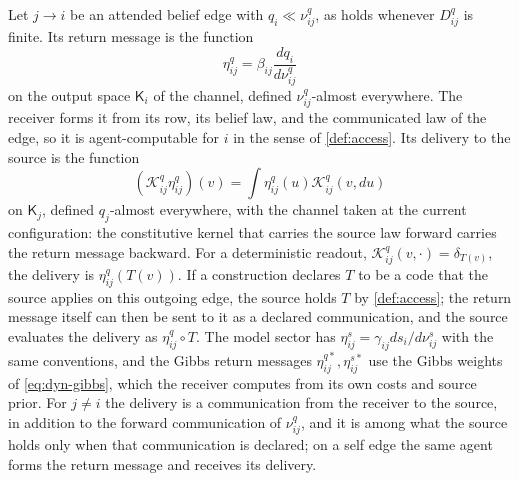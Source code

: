 Let $j\to i$ be an attended belief edge with $q_i\ll\nu^q_{ij}$, as holds whenever $D^q_{ij}$ is finite. Its return message is the function
\begin{equation}
 \eta^q_{ij}=\beta_{ij}\frac{dq_i}{d\nu^q_{ij}}
 \label{eq:dyn-return-message}
\end{equation}
on the output space $\mathsf K_i$ of the channel, defined $\nu^q_{ij}$-almost everywhere. The receiver forms it from its row, its belief law, and the communicated law of the edge, so it is agent-computable for $i$ in the sense of \cref{def:access}. Its delivery to the source is the function
\begin{equation}
 (\mathcal K^q_{ij}\eta^q_{ij})(v)=\int\eta^q_{ij}(u)\mathcal K^q_{ij}(v,du)
 \label{eq:dyn-return-delivery}
\end{equation}
on $\mathsf K_j$, defined $q_j$-almost everywhere, with the channel taken at the current configuration: the constitutive kernel that carries the source law forward carries the return message backward. For a deterministic readout, $\mathcal K^q_{ij}(v,\cdot)=\delta_{T(v)}$, the delivery is $\eta^q_{ij}(T(v))$. If a construction declares $T$ to be a code that the source applies on this outgoing edge, the source holds $T$ by \cref{def:access}; the return message itself can then be sent to it as a declared communication, and the source evaluates the delivery as $\eta^q_{ij}\circ T$. The model sector has $\eta^s_{ij}=\gamma_{ij}ds_i/d\nu^s_{ij}$ with the same conventions, and the Gibbs return messages $\eta^{q*}_{ij},\eta^{s*}_{ij}$ use the Gibbs weights of \cref{eq:dyn-gibbs}, which the receiver computes from its own costs and source prior. For $j\neq i$ the delivery is a communication from the receiver to the source, in addition to the forward communication of $\nu^q_{ij}$, and it is among what the source holds only when that communication is declared; on a self edge the same agent forms the return message and receives its delivery.

